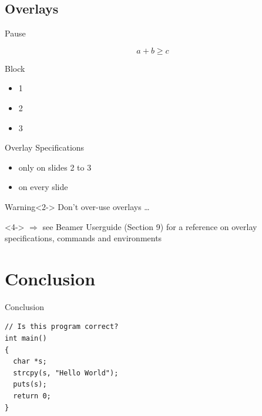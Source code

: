 \documentclass[xcolor={dvipsnames,table}]{beamer}
\begin{document}
  \subsection{Overlays}

  \begin{frame}{Pause}
    \begin{example}
      \begin{equation}
        a + b \geq c
      \end{equation}
    \end{example}
    \pause
    \begin{block}{Block}
      \begin{itemize}
        \item 1
          \pause
        \item 2
        \item 3
      \end{itemize}
    \end{block}
  \end{frame}

  \begin{frame}{Overlay Specifications}
    \begin{itemize}
      \item<2-3> only on slides 2 to 3
      \item<1-> on every slide
    \end{itemize}
    \begin{block}{Warning}<2->
      \alert{Don't over-use overlays \dots}
    \end{block}
    \vspace{3em}
    \begin{onlyenv}<4->
      $\Rightarrow$ see Beamer Userguide (Section 9) for a reference on overlay
      specifications, commands and environments
    \end{onlyenv}
  \end{frame}

\section{Conclusion}

\begin{frame}[fragile]{Conclusion}
  \begin{lstlisting}
// Is this program correct?
int main()
{
  char *s;
  strcpy(s, "Hello World");
  puts(s);
  return 0;
}
\end{lstlisting}
\end{frame}
\end{document}
